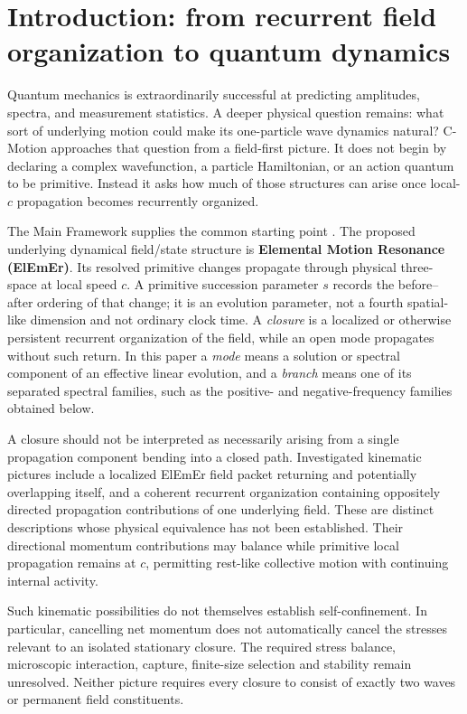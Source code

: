 \documentclass[11pt]{article}
\theoremstyle{definition}
\newcommand{\cmotion}{\mbox{C-Motion}}
\begin{document}
\medskip

\section{Introduction: from recurrent field organization to quantum dynamics}
\label{sec:scope}

Quantum mechanics is extraordinarily successful at predicting amplitudes, spectra, and
measurement statistics.  A deeper physical question remains: what sort of underlying motion
could make its one-particle wave dynamics natural?  \cmotion{} approaches that question from
a field-first picture.  It does not begin by declaring a complex wavefunction, a particle
Hamiltonian, or an action quantum to be primitive.  Instead it asks how much of those
structures can arise once local-$c$ propagation becomes recurrently organized.

The Main Framework supplies the common starting point \cite{CmotionMainFramework2026}.  The
proposed underlying dynamical field/state structure is \textbf{Elemental Motion Resonance
(ElEmEr)}.  Its resolved primitive changes propagate through physical three-space at local
speed $c$.  A primitive succession parameter $s$ records the before--after ordering of that
change; it is an evolution parameter, not a fourth spatial-like dimension and not ordinary
clock time.  A \emph{closure} is a localized or otherwise persistent recurrent organization of
the field, while an open mode propagates without such return.  In this paper a \emph{mode}
means a solution or spectral component of an effective linear evolution, and a \emph{branch}
means one of its separated spectral families, such as the positive- and negative-frequency
families obtained below.

A closure should not be interpreted as necessarily arising from a
single propagation component bending into a closed path. Investigated
kinematic pictures include a localized ElEmEr field packet returning
and potentially overlapping itself, and a coherent recurrent
organization containing oppositely directed propagation contributions
of one underlying field. These are distinct descriptions whose
physical equivalence has not been established. Their directional
momentum contributions may balance while primitive local propagation
remains at $c$, permitting rest-like collective motion with continuing
internal activity.

Such kinematic possibilities do not themselves establish
self-confinement. In particular, cancelling net momentum does not
automatically cancel the stresses relevant to an isolated stationary
closure. The required stress balance, microscopic interaction, capture,
finite-size selection and stability remain unresolved. Neither picture
requires every closure to consist of exactly two waves or permanent
field constituents.
\end{document}
